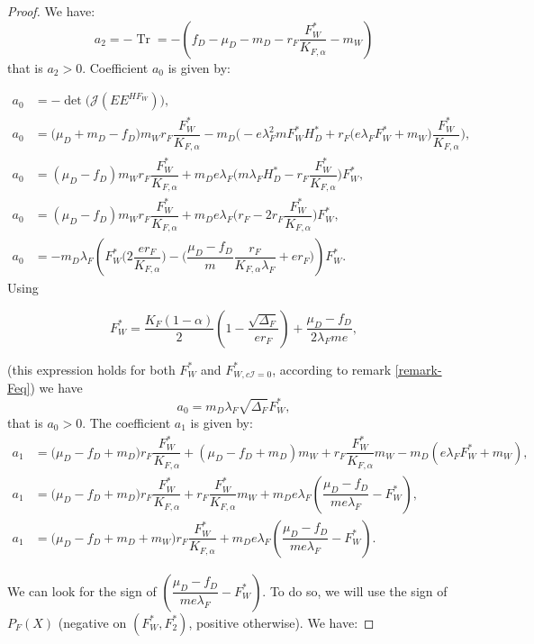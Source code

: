 \documentclass{article}
\newcommand{\lfw}{\lambda_{F}}
\newcommand{\lfw}{\lambda_{F}}
\DeclareMathOperator{\Tr}{Tr}
\begin{document}
\begin{proof}
We have:
\begin{equation*}
a_2 = - \Tr = -(f_D - \mu_D - m_D - r_F \dfrac{F_W^*}{K_{F, \alpha}} - m_W)
\end{equation*}
that is $a_2>0$. Coefficient $a_0$ is given by:

\begin{align*}
a_0 &= -\det\Big(\mathcal{J}(EE^{H F_W})\Big), \\
a_0 &= \Big(\mu_D + m_D -f_D \Big) m_W r_F \dfrac{F^*_W}{K_{F, \alpha}} - m_D\Big(-e\lfw ^2 m F_W^* H_D^* + r_F \big(e \lfw F^*_W + m_W \big) \dfrac{F^*_W}{K_{F, \alpha}} \Big), \\
a_0 &= (\mu_D-f_D) m_W r_F \dfrac{F^*_W}{K_{F, \alpha}} + m_D e \lfw \Big( m \lfw H_D^* - r_F \dfrac{F^*_W}{K_{F, \alpha}} \Big) F^*_W, \\
a_0 &= (\mu_D-f_D) m_W r_F \dfrac{F^*_W}{K_{F, \alpha}} + m_D e \lfw \Big( r_F - 2 r_F \dfrac{F^*_W}{K_{F, \alpha}} \Big) F^*_W, \\
a_0 &= - m_D \lfw \left( F_W^* \Big(2 \dfrac{e r_F}{K_{F, \alpha}} \Big) - \Big(\dfrac{\mu_D - f_D}{m} \dfrac{r_F}{K_{F, \alpha} \lfw} + er_F \Big) \right) F_W^*.
\end{align*}
Using 

\begin{equation*}
F_W^* = \dfrac{K_F(1-\alpha)}{2}\left(1 - \dfrac{\sqrt{\Delta_F}}{er_F}\right) + \dfrac{\mu_D - f_D}{2\lfw m e},
\end{equation*}

(this expression holds for both $F_W^*$ and $F^*_{W, c\mathcal{I} = 0}$, according to remark \ref{remark-Feq}) we have 
\begin{equation*}
a_0 = m_D \lfw \sqrt{\Delta_F}  F^*_{W},
\end{equation*}
that is $a_0>0$. The coefficient $a_1$ is given by:
\begin{align*}
a_1 &= \big( \mu_D  -f_D + m_D) r_F \dfrac{F^*_W}{K_{F, \alpha}} + (\mu_D -f_D + m_D) m_W + r_F \dfrac{F_W^*}{K_{F, \alpha}} m_W - m_D (e\lfw F^*_W + m_W), \\
a_1 &= \big( \mu_D -f_D + m_D) r_F \dfrac{F^*_W}{K_{F, \alpha}}  + r_F \dfrac{F_W^*}{K_{F, \alpha}} m_W + m_D e\lfw   \left(\dfrac{\mu_D - f_D}{m e\lfw} - F^*_W \right),  \\
a_1 &= \big( \mu_D -f_D + m_D + m_W) r_F \dfrac{F^*_W}{K_{F, \alpha}}   + m_D e\lfw   \left(\dfrac{\mu_D - f_D}{m e\lfw} - F^*_W \right).
\end{align*}

We can look for the sign of $\left(\dfrac{\mu_D -f_D}{m e\lfw} - F^*_{W}\right)$. To do so, we will use the sign of $P_F(X)$ (negative on $(F^*_W, F^*_2)$, positive otherwise). We have:


\end{proof}
\end{document}
